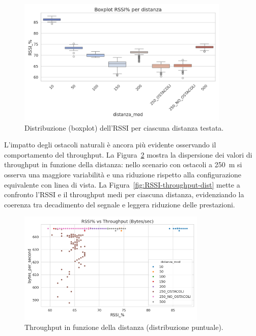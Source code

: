 \documentclass[12pt,a4paper,twoside]{book}
\begin{document}
\begin{figure}[H]
    \centering
    \includegraphics[width=0.9\textwidth]{img/tests/T1/T1-rssi_dist_box.png}
    \caption{Distribuzione (boxplot) dell'RSSI per ciascuna distanza testata.}
    \label{fig:throughput-rssi-dist-box}
\end{figure}
\newpage
L’impatto degli ostacoli naturali è ancora più evidente osservando il comportamento
del throughput. La Figura~\ref{fig:rssi-throughput-scat} mostra la dispersione dei
valori di throughput in funzione della distanza: nello scenario con ostacoli a 250~m
si osserva una maggiore variabilità e una riduzione rispetto alla configurazione
equivalente con linea di vista. La Figura~\ref{fig:RSSI-throughput-dist} mette a
confronto l’RSSI e il throughput medi per ciascuna distanza, evidenziando la coerenza
tra decadimento del segnale e leggera riduzione delle prestazioni.

\begin{figure}[H]
    \centering
    \includegraphics[width=0.8\textwidth]{img/tests/T1/T1-rssi_throughput_scat.png}
    \caption{Throughput in funzione della distanza (distribuzione puntuale).}
    \label{fig:rssi-throughput-scat}
\end{figure}
\end{document}

